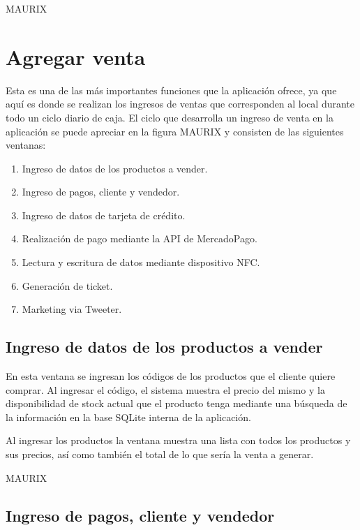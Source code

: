 MAURIX

\section{Agregar venta}
\label{sec:ui.addsale}

Esta es una de las m\'as importantes funciones que la aplicaci\'on ofrece, ya que aqu\'i es donde se realizan los ingresos de ventas que corresponden al local durante todo un ciclo diario de caja. El ciclo que desarrolla un ingreso de venta en la aplicaci\'on se puede apreciar en la figura MAURIX y consisten de las siguientes ventanas:

\begin{enumerate}
\item Ingreso de datos de los productos a vender.
\item Ingreso de pagos, cliente y vendedor.
\item Ingreso de datos de tarjeta de cr\'edito.
\item Realizaci\'on de pago mediante la \ac{API} de MercadoPago.
\item Lectura y escritura de datos mediante dispositivo \ac{NFC}.
\item Generaci\'on de ticket.
\item Marketing via Tweeter.
\end{enumerate}

\subsection{Ingreso de datos de los productos a vender}
\label{subsec:ui.addsale.products}

En esta ventana se ingresan los c\'odigos de los productos que el cliente quiere comprar. Al ingresar el c\'odigo, el sistema muestra el precio del mismo y la disponibilidad de stock actual que el producto tenga mediante una b\'usqueda de la informaci\'on en la base SQLite interna de la aplicaci\'on.

Al ingresar los productos la ventana muestra una lista con todos los productos y sus precios, as\'i como tambi\'en el total de lo que ser\'ia la venta a generar.

MAURIX

\subsection{Ingreso de pagos, cliente y vendedor}
\label{subsec:ui.addsale.payments}

